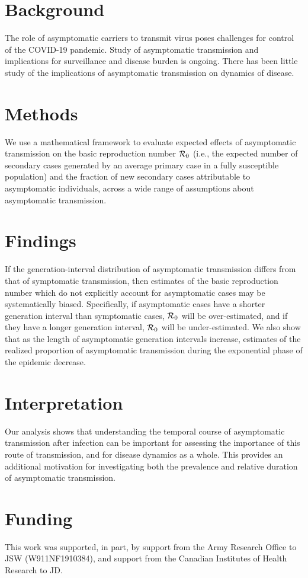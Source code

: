 {\footnotesize 
\section*{Background}

The role of asymptomatic carriers to transmit virus poses challenges for control of the COVID-19 pandemic. 
Study of asymptomatic transmission and implications for surveillance and disease burden is ongoing. 
There has been little study of the implications of asymptomatic transmission on dynamics of disease.

\section*{Methods}

We use a mathematical framework to evaluate expected effects of asymptomatic transmission on the basic reproduction number ${\cal{R}}_0$ (i.e., the expected number of secondary cases generated by an average primary case in a fully susceptible population) and the fraction of new secondary cases attributable to asymptomatic individuals, across a wide range of assumptions about asymptomatic transmission.

\section*{Findings}

If the generation-interval distribution of asymptomatic transmission differs from that of symptomatic transmission, then estimates of the basic reproduction number which do not explicitly account for asymptomatic cases may be systematically biased. 
Specifically, if asymptomatic cases have a shorter generation interval than symptomatic cases, ${\cal{R}}_0$ will be over-estimated, and if they have a longer generation interval, ${\cal{R}}_0$ will be under-estimated.
We also show that as the length of asymptomatic generation intervals increase, estimates of the realized proportion of asymptomatic transmission during the exponential phase of the epidemic decrease.

\section*{Interpretation}

Our analysis shows that understanding the temporal course of asymptomatic transmission after infection can be important for assessing the importance of this route of transmission, and for disease dynamics as a whole. This provides an additional motivation for investigating both the prevalence and relative duration of asymptomatic transmission. 

\section*{Funding}

This work was supported, in part, by support from the Army Research Office to JSW (W911NF1910384), and support from the Canadian Institutes of Health Research to JD.}
